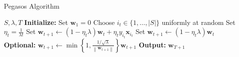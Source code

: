 \documentclass{article}
\begin{document}
\begin{algorithm}
\caption{Pegasos Algorithm}
\begin{algorithmic}[1]
\Require $S, \lambda, T$
\State \textbf{Initialize:} Set $\mathbf{w}_1 = 0$
    \State Choose $i_t \in \{1, \dots, |S|\}$ uniformly at random
    \State Set $\eta_t = \frac{1}{\lambda t}$
        \State Set $\mathbf{w}_{t+1} \leftarrow (1 - \eta_t \lambda) \mathbf{w}_t + \eta_t y_{i_t} \mathbf{x}_{i_t}$
    \Else
        \State Set $\mathbf{w}_{t+1} \leftarrow (1 - \eta_t \lambda) \mathbf{w}_t$
    \EndIf
    \State \textbf{Optional:} $\mathbf{w}_{t+1} \leftarrow \min \left\{1, \frac{1 / \sqrt{\lambda}}{\left\| \mathbf{w}_{t+1} \right\|} \right\} \mathbf{w}_{t+1}$
\EndFor
\State \textbf{Output:} $\mathbf{w}_{T+1}$
\end{algorithmic}\label{alg:algorithm}

\end{algorithm}
\end{document}
